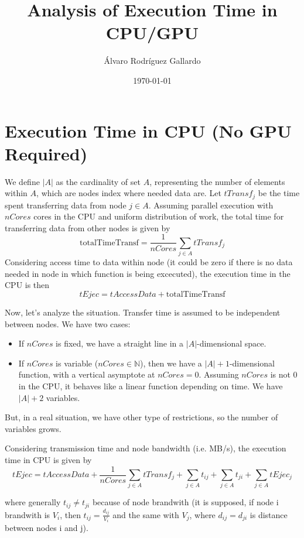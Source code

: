 \documentclass{article}
\title{Analysis of Execution Time in CPU/GPU}
\author{Álvaro Rodríguez Gallardo}
\date{\today}
\begin{document}
\maketitle

\section{Execution Time in CPU (No GPU Required)}

We define $|A|$ as the cardinality of set $A$, representing the number of elements within $A$, which are nodes index where needed data are. Let $tTransf_j$ be the time spent transferring data from node $j \in A$. Assuming parallel execution with $nCores$ cores in the CPU and uniform distribution of work, the total time for transferring data from other nodes is given by
\[
\text{totalTimeTransf} = \frac{1}{nCores} \sum_{j \in A} tTransf_j
\]
Considering access time to data within node (it could be zero if there is no data needed in node in which function is being excecuted), the execution time in the CPU is then
\[
tEjec = tAccessData + \text{totalTimeTransf}
\]

Now, let's analyze the situation. Transfer time is assumed to be independent between nodes. We have two cases:

\begin{itemize}
  \item If $nCores$ is fixed, we have a straight line in a $|A|$-dimensional space.
  \item If $nCores$ is variable ($nCores \in \mathbb{N}$), then we have a $|A|+1$-dimensional function, with a vertical asymptote at $nCores=0$. Assuming $nCores$ is not 0 in the CPU, it behaves like a linear function depending on time. We have $|A|+2$ variables.
\end{itemize}

But, in a real situation, we have other type of restrictions, so the number of variables grows.

Considering transmission time and node bandwidth (i.e. MB/s), the execution time in CPU is given by
\[
tEjec = tAccessData + \frac{1}{nCores} \sum_{j \in A} tTransf_j + \sum_{j \in A} t_{ij} + \sum_{j \in A} t_{ji} + \sum_{j \in A} tEjec_j
\]

where generally \(t_{ij} \neq t_{ji}\) because of node brandwith (it is supposed, if node i brandwith is \(V_i\), then \(t_{ij}=\frac{d_{ij}}{V_i}\) and the same with \(V_j\), where \(d_{ij}=d_{ji}\) is distance between nodes i and j).
\end{document}
